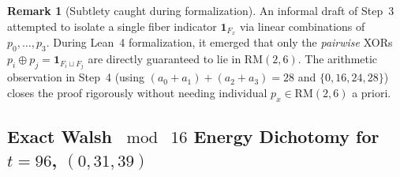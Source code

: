 \documentclass[11pt]{article}
\theoremstyle{definition}
\newtheorem{remark}[theorem]{Remark}
\newcommand{\ind}{\mathbf{1}}
\begin{document}
\begin{remark}[Subtlety caught during formalization]
An informal draft of Step~3 attempted to isolate a single fiber indicator $\ind_{F_x}$ via linear combinations of $p_0, \dots, p_3$. During Lean~4 formalization, it emerged that only the \emph{pairwise} XORs $p_i \oplus p_j = \ind_{F_i \sqcup F_j}$ are directly guaranteed to lie in $\mathrm{RM}(2, 6)$. The arithmetic observation in Step~4 (using $(a_0+a_1)+(a_2+a_3)=28$ and $\{0, 16, 24, 28\}$) closes the proof rigorously without needing individual $p_x \in \mathrm{RM}(2, 6)$ a priori.
\end{remark}

\subsection{Exact Walsh $\bmod\;16$ Energy Dichotomy for $t = 96$, $(0, 31, 39)$}
\end{document}
